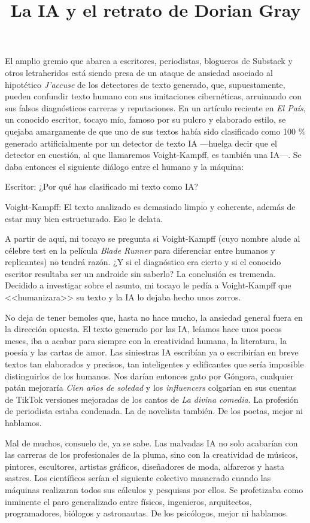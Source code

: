 \documentclass[11pt,a4paper]{article}
\title{La IA y el retrato de Dorian Gray}
\author{}
\date{}
\begin{document}
\maketitle

El amplio gremio que abarca a escritores, periodistas, blogueros de Substack y otros letraheridos está siendo presa de un ataque de ansiedad asociado al hipotético \emph{J'accuse} de los detectores de texto generado, que, supuestamente, pueden confundir texto humano con sus imitaciones cibernéticas, arruinando con sus falsos diagnósticos carreras y reputaciones. En un artículo reciente en \emph{El País}, un conocido escritor, tocayo mío, famoso por su pulcro y elaborado estilo, se quejaba amargamente de que uno de sus textos había sido clasificado como 100 \% generado artificialmente por un detector de texto IA ---huelga decir que el detector en cuestión, al que llamaremos Voight-Kampff, es también una IA---. Se daba entonces el siguiente diálogo entre el humano y la máquina:

Escritor: ¿Por qué has clasificado mi texto como IA?

Voight-Kampff: El texto analizado es demasiado limpio y coherente, además de estar muy bien estructurado. Eso le delata.

A partir de aquí, mi tocayo se pregunta si Voight-Kampff (cuyo nombre alude al célebre test en la película \emph{Blade Runner} para diferenciar entre humanos y replicantes) no tendrá razón. ¿Y si el diagnóstico era cierto y si el conocido escritor resultaba ser un androide sin saberlo? La conclusión es tremenda. Decidido a investigar sobre el asunto, mi tocayo le pedía a Voight-Kampff que <<humanizara>> su texto y la IA lo dejaba hecho unos zorros. 
 
 
No deja de tener bemoles que, hasta no hace mucho, la ansiedad general fuera en la dirección opuesta. El texto generado por las IA, leíamos hace unos pocos meses, iba a acabar para siempre con la creatividad humana, la literatura, la poesía y las cartas de amor. Las siniestras IA escribían ya o escribirían en breve textos tan elaborados y precisos, tan inteligentes y edificantes que sería imposible distinguirlos de los humanos. Nos darían entonces gato por Góngora, cualquier patán mejoraría \emph{Cien años de soledad} y los \emph{influencers} colgarían en sus cuentas de TikTok versiones mejoradas de los cantos de \emph{La divina comedia}. La profesión de periodista estaba condenada. La de novelista también. De los poetas, mejor ni hablamos.

Mal de muchos, consuelo de, ya se sabe. Las malvadas IA no solo acabarían con las carreras de los profesionales de la pluma, sino con la creatividad de músicos, pintores, escultores, artistas gráficos, diseñadores de moda, alfareros y hasta sastres. Los científicos serían el siguiente colectivo masacrado cuando las máquinas realizaran todos sus cálculos y pesquisas por ellos. Se profetizaba como inminente el paro generalizado entre físicos, ingenieros, arquitectos, programadores, biólogos y astronautas. De los psicólogos, mejor ni hablamos. 
\end{document}
